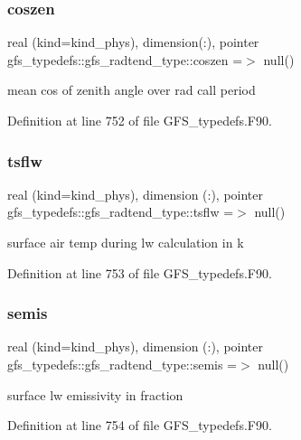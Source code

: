 \subsubsection{coszen}
{\footnotesize\ttfamily real (kind=kind\+\_\+phys), dimension(\+:), pointer gfs\+\_\+typedefs\+::gfs\+\_\+radtend\+\_\+type\+::coszen =$>$ null()}



mean cos of zenith angle over rad call period 



Definition at line 752 of file G\+F\+S\+\_\+typedefs.\+F90.

\mbox{\label{structgfs__typedefs_1_1gfs__radtend__type_a9169ff023fad2126b452af2077571d90}} 
\subsubsection{tsflw}
{\footnotesize\ttfamily real (kind=kind\+\_\+phys), dimension (\+:), pointer gfs\+\_\+typedefs\+::gfs\+\_\+radtend\+\_\+type\+::tsflw =$>$ null()}



surface air temp during lw calculation in k 



Definition at line 753 of file G\+F\+S\+\_\+typedefs.\+F90.

\mbox{\label{structgfs__typedefs_1_1gfs__radtend__type_a2b78fe037b4959c60413c3cd0bbbb378}} 
\subsubsection{semis}
{\footnotesize\ttfamily real (kind=kind\+\_\+phys), dimension (\+:), pointer gfs\+\_\+typedefs\+::gfs\+\_\+radtend\+\_\+type\+::semis =$>$ null()}



surface lw emissivity in fraction 



Definition at line 754 of file G\+F\+S\+\_\+typedefs.\+F90.

\mbox{\label{structgfs__typedefs_1_1gfs__radtend__type_a69483d91fc1bc66ef1a9104e16869284}} 
